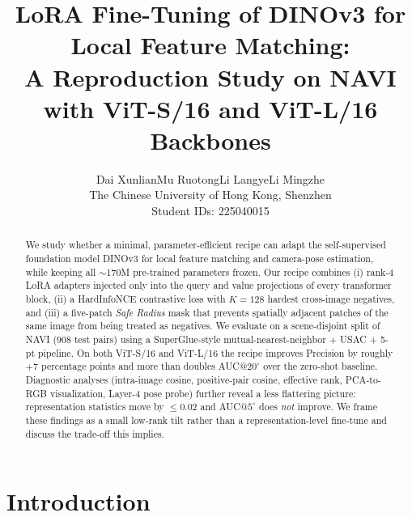 \documentclass[10pt,twocolumn,letterpaper]{article}
\title{LoRA Fine-Tuning of DINOv3 for Local Feature Matching:\\
A Reproduction Study on NAVI with ViT-S/16 and ViT-L/16 Backbones}
\author{%
Dai Xunlian\quad Mu Ruotong\quad Li Langye\quad Li Mingzhe\\
The Chinese University of Hong Kong, Shenzhen\\
Student IDs: 225040015\quad 225040014\quad 225040134\quad 225045024
}
\begin{document}
\maketitle

\begin{abstract}
We study whether a minimal, parameter-efficient recipe can adapt the
self-supervised foundation model DINOv3 for local feature matching and
camera-pose estimation, while keeping all $\sim$170M pre-trained
parameters frozen. Our recipe combines (i) rank-4 LoRA adapters injected
only into the query and value projections of every transformer block,
(ii) a HardInfoNCE contrastive loss with $K=128$ hardest cross-image
negatives, and (iii) a five-patch \emph{Safe Radius} mask that prevents
spatially adjacent patches of the same image from being treated as
negatives. We evaluate on a scene-disjoint split of NAVI ($908$ test
pairs) using a SuperGlue-style mutual-nearest-neighbor + USAC + 5-pt
pipeline. On both ViT-S/16 and ViT-L/16 the recipe improves Precision by
roughly $+7$ percentage points and more than doubles AUC@$20^\circ$ over
the zero-shot baseline. Diagnostic analyses (intra-image cosine,
positive-pair cosine, effective rank, PCA-to-RGB visualization, Layer-4
pose probe) further reveal a less flattering picture: representation
statistics move by $\le 0.02$ and AUC@$5^\circ$ does \emph{not} improve.
We frame these findings as a small low-rank tilt rather than a
representation-level fine-tune and discuss the trade-off this implies.
\end{abstract}

\section{Introduction}
\label{sec:intro}
\end{document}
